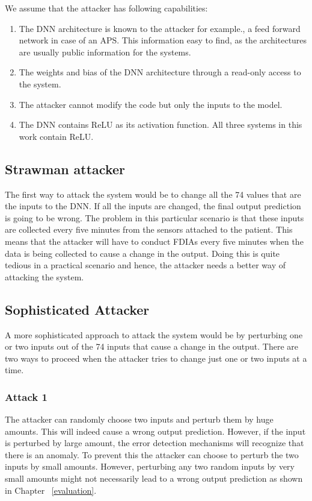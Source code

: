 We assume that the attacker has following capabilities:
\begin{enumerate}
	\item The \ac{DNN}  architecture  is known to the attacker for example., a feed forward  network in case of an \ac{APS}. This information easy to find, as the architectures are  usually public information for the systems. 
	\item  The weights and bias of the \ac{DNN}  architecture through a read-only access to the system.  
	\item The attacker cannot modify the code but only the inputs to the model.
	\item The \ac{DNN} contains ReLU as its activation function. 
	All three systems in this work contain ReLU.
\end{enumerate}

\subsection{Strawman attacker}
The first way to attack the system would be to change all the 74 values that are the inputs to the DNN.
 If all the inputs are changed, the final output prediction is going to be wrong. The problem in this particular scenario is that 
 these inputs are collected every five minutes from the sensors attached to the patient. 
 This means that the attacker will have to conduct FDIAs every five minutes when the data is being collected to cause a change in the output. 
 Doing this is quite tedious in a practical scenario and hence, the attacker needs a better way of attacking the system. 

\subsection{Sophisticated Attacker}
A more sophisticated approach to attack the system would be by perturbing one or two inputs out of the 74 inputs that cause a change in the output. There are two ways to proceed when the attacker tries to change just one or two inputs at a time. 

\subsubsection{Attack 1}
The attacker can randomly choose two inputs and perturb them by huge amounts. 
This will indeed cause a wrong output prediction. 
However, if the input is perturbed by large amount, the error detection mechanisms will recognize that there is an anomaly. 
To prevent this the attacker can choose to perturb the two inputs by small amounts. 
However, perturbing any two random inputs by very small amounts might not necessarily lead to a wrong output prediction as shown in Chapter ~\ref{evaluation}. 

